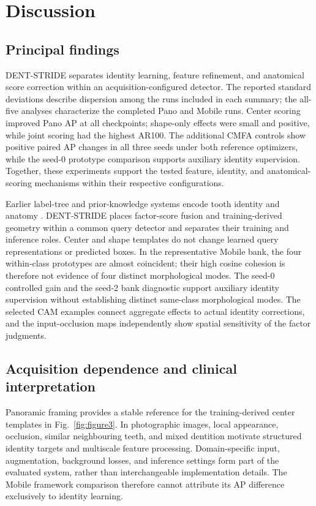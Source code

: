 \documentclass[a4paper,fleqn]{cas-dc}
\begin{document}
\section{Discussion}
\label{sec:discussion}

\subsection{Principal findings}

DENT-STRIDE separates identity learning, feature refinement, and anatomical score correction within an acquisition-configured detector. The reported standard deviations describe dispersion among the runs included in each summary; the all-five analyses characterize the completed Pano and Mobile runs.  Center scoring improved Pano AP at all checkpoints; shape-only effects were small and positive, while joint scoring had the highest AR100. The additional CMFA controls show positive paired AP changes in all three seeds under both reference optimizers, while the seed-0 prototype comparison supports auxiliary identity supervision. Together, these experiments support the tested feature, identity, and anatomical-scoring mechanisms within their respective configurations.

Earlier label-tree and prior-knowledge systems encode tooth identity and anatomy \citep{zhang2018labeltree,ali2023teeth}. DENT-STRIDE places factor-score fusion and training-derived geometry within a common query detector and separates their training and inference roles. Center and shape templates do not change learned query representations or predicted boxes. In the representative Mobile bank, the four within-class prototypes are almost coincident; their high cosine cohesion is therefore not evidence of four distinct morphological modes. The seed-0 controlled gain and the seed-2 bank diagnostic support auxiliary identity supervision without establishing distinct same-class morphological modes. The selected CAM examples connect aggregate effects to actual identity corrections, and the input-occlusion maps independently show spatial sensitivity of the factor judgments.

\subsection{Acquisition dependence and clinical interpretation}

Panoramic framing provides a stable reference for the training-derived center templates in Fig.~\ref{fig:figure3}. In photographic images, local appearance, occlusion, similar neighbouring teeth, and mixed dentition motivate structured identity targets and multiscale feature processing. Domain-specific input, augmentation, background losses, and inference settings form part of the evaluated system, rather than interchangeable implementation details. The Mobile framework comparison therefore cannot attribute its AP difference exclusively to identity learning.
\end{document}
